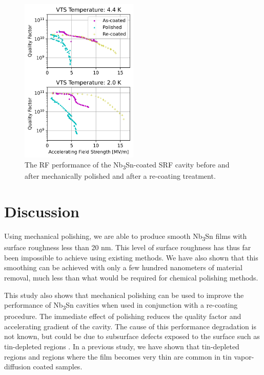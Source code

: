 \documentclass[reprint,amsmath,amssymb,aps]{revtex4-2}%
\begin{document}
\begin{figure}[htb]%
\centering%
\includegraphics[width=0.5\textwidth]{../doc/figs/VTS_Test_Graph.png}%
\caption{The RF performance of the Nb\textsubscript{3}Sn-coated SRF cavity before and after mechanically polished and after a re-coating treatment.}%
\label{fig:vtstestgraph}%
\end{figure}

%
\section{Discussion}%
\label{sec:Discussion}%
Using mechanical polishing, we are able to produce smooth Nb\textsubscript{3}Sn films with surface roughness less than 20 nm. This level of surface roughness has thus far been impossible to achieve using existing methods. \cite{posen2021advances,pudasaini2018studies,pudasaini2017post,hu2019reducing} We have also shown that this smoothing can be achieved with only a few hundred nanometers of material removal, much less than what would be required for chemical polishing methods.

This study also shows that mechanical polishing can be used to improve the performance of Nb\textsubscript{3}Sn cavities when used in conjunction with a re-coating procedure. The immediate effect of polishing reduces the quality factor and accelerating gradient of the cavity. The cause of this performance degradation is not known, but could be due to subsurface defects exposed to the surface such as tin-depleted regions \cite{lee2018atomic}. In a previous study, we have shown that tin-depleted regions and regions where the film becomes very thin are common in tin vapor-diffusion coated samples\cite{citation needed}.
\end{document}
